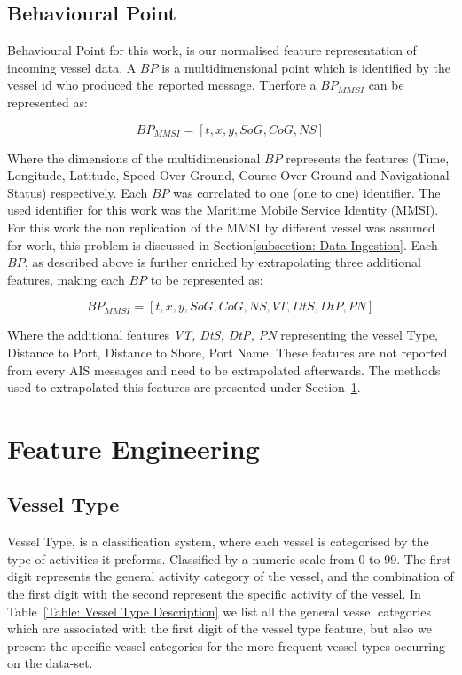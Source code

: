 \subsection{Behavioural Point}
\label{subsection: Behavioural Point}
Behavioural Point for this work, is our normalised feature representation of incoming vessel data. A $BP$ is a multidimensional point which is identified by the vessel id who produced the reported message. Therfore a $BP_{MMSI}$ can be represented as:

\[BP_{MMSI} = [t, x, y, SoG, CoG, NS]\]

Where the dimensions of the multidimensional $BP$ represents the features (Time, Longitude, Latitude, Speed Over Ground, Course Over Ground and Navigational Status) respectively.
Each $BP$ was correlated to one (one to one) identifier. The used identifier for this work was the Maritime Mobile Service Identity (MMSI). For this work the non replication of the MMSI by different vessel was assumed for work, this problem is discussed in Section\ref{subsection: Data Ingestion}.
Each $BP$, as described above is further enriched by extrapolating three additional features, making each $BP$ to be represented as:

\[BP_{MMSI} = [t, x, y, SoG, CoG, NS, VT, DtS, DtP, PN]\]

Where the additional features \emph{VT, DtS, DtP, PN} representing the vessel Type, Distance to Port, Distance to Shore, Port Name. These features are not reported from every AIS messages and need to be extrapolated afterwards. The methods used to extrapolated this features are presented under Section~\ref{section: 4 Feature Engineering}. 

\section{Feature Engineering}
\label{section: 4 Feature Engineering}

\subsection{Vessel Type}
\label{subsection: Vessel Type}
Vessel Type, is a classification system, where each vessel is categorised by the type of activities it preforms. Classified by a numeric scale from 0 to 99. The first digit represents the general activity category of the vessel, and the combination of the first digit with the second represent the specific activity of the vessel. In Table~\ref{Table: Vessel Type Description} we list all the general vessel categories which are associated with the first digit of the vessel type feature, but also we present the specific vessel categories for the more frequent vessel types occurring on the data-set.

